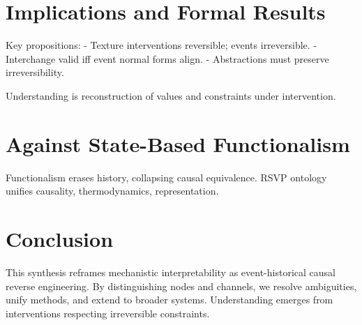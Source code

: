 \documentclass[11pt]{article}
\theoremstyle{remark}
\begin{document}
\section{Implications and Formal Results}

Key propositions:
- Texture interventions reversible; events irreversible.
- Interchange valid iff event normal forms align.
- Abstractions must preserve irreversibility.

Understanding is reconstruction of values and constraints under intervention.

\section{Against State-Based Functionalism}

Functionalism erases history, collapsing causal equivalence. RSVP ontology unifies causality, thermodynamics, representation.

\section{Conclusion}

This synthesis reframes mechanistic interpretability as event-historical causal reverse engineering. By distinguishing nodes and channels, we resolve ambiguities, unify methods, and extend to broader systems. Understanding emerges from interventions respecting irreversible constraints.
\end{document}
